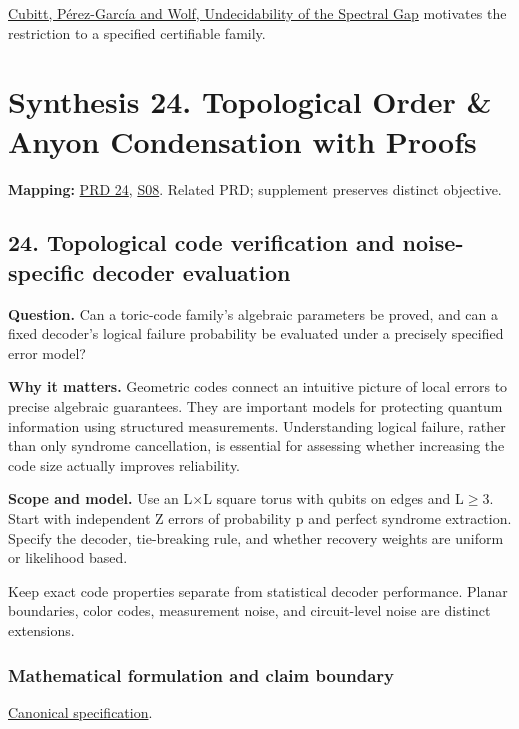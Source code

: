 \documentclass[
  11pt,
]{article}
\begin{document}
\href{https://arxiv.org/abs/1502.04573}{Cubitt, Pérez-García and Wolf,
Undecidability of the Spectral Gap} motivates the restriction to a
specified certifiable family.

\section{Synthesis 24. Topological Order \& Anyon Condensation with
Proofs}

\textbf{Mapping:}
\href{https://github.com/rick-stevens-ai/Pure-Thought/blob/main/PRDs/24-Topological-Quantum-Error-Correction.md}{PRD
24},
\href{https://github.com/rick-stevens-ai/Pure-Thought/blob/main/supplemental/S08.md}{S08}.
Related PRD; supplement preserves distinct objective.

\subsection{24. Topological code verification and noise-specific decoder
evaluation}

\textbf{Question.} Can a toric-code family's algebraic parameters be
proved, and can a fixed decoder's logical failure probability be
evaluated under a precisely specified error model?

\textbf{Why it matters.} Geometric codes connect an intuitive picture of
local errors to precise algebraic guarantees. They are important models
for protecting quantum information using structured measurements.
Understanding logical failure, rather than only syndrome cancellation,
is essential for assessing whether increasing the code size actually
improves reliability.

\textbf{Scope and model.} Use an L\ensuremath{\times}L square torus with
qubits on edges and L\ensuremath{\ge}3. Start with independent Z errors
of probability p and perfect syndrome extraction. Specify the decoder,
tie-breaking rule, and whether recovery weights are uniform or
likelihood based.

Keep exact code properties separate from statistical decoder
performance. Planar boundaries, color codes, measurement noise, and
circuit-level noise are distinct extensions.

\subsubsection{Mathematical formulation and claim boundary}

\href{https://github.com/rick-stevens-ai/Pure-Thought/blob/main/PRDs/24-Topological-Quantum-Error-Correction.md}{Canonical
specification}.
\end{document}
